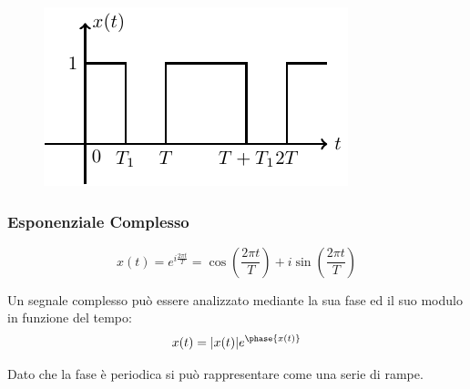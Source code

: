\documentclass{article}
\numberwithin{equation}{subsection}
\begin{document}
\begin{figure}[H]%
    \centering
    \includegraphics{onda-quadra.pdf}%
\end{figure}

\subsubsection{Esponenziale Complesso}

\begin{equation}
    x(t)=\displaystyle e^{i\frac{2\pi t}{T}}=\cos\left(\frac{2\pi t}{T}\right)+i\sin\left(\frac{2\pi t}{T}\right)
\end{equation}

Un segnale complesso può essere analizzato mediante la sua fase ed il suo modulo in funzione del tempo:
\begin{equation*}
    x(t)=|x(t)|e^{\phase{x(t)}}
\end{equation*}

Dato che la fase è periodica si può rappresentare come una serie di rampe.

\begin{figure}[H]%
    \centering
    \qquad
\end{figure}
\end{document}
